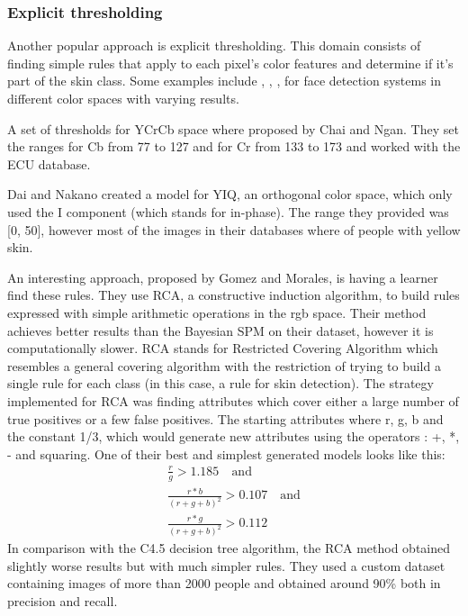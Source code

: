 \documentclass[12pt]{report}
\begin{document}
	\subsubsection{Explicit thresholding}
	Another popular approach is explicit thresholding. This domain consists of finding simple rules that apply to each pixel's color features and determine if it's part of the skin class. Some examples include \cite{rgb_threshold}, \cite{cr_cb_threshold}, \cite{yiq_threshold}, \cite{i_threshold} for face detection systems in different color spaces with varying results. 
 	
 	A set of thresholds for YCrCb space where proposed by Chai and Ngan\cite{cr_cb_threshold}. They set the ranges for Cb from 77 to 127 and for Cr from 133 to 173 and worked with the ECU database.
 	
 	Dai and Nakano\cite{yiq_threshold} created a model for YIQ, an orthogonal color space, which only used the I component (which stands for in-phase). The range they provided was [0, 50], however most of the images in their databases where of people with yellow skin.
 	
 	An interesting approach, proposed by Gomez and Morales\cite{rca_threshold}, is having a learner find these rules. They use RCA, a constructive induction algorithm, to build rules expressed with simple arithmetic operations in the rgb space. Their method achieves better results than the Bayesian SPM on their dataset, however it is computationally slower. RCA stands for Restricted Covering Algorithm which resembles a general covering algorithm with the restriction of trying to build a single rule for each class (in this case, a rule for skin detection). The strategy implemented for RCA was finding attributes which cover either a large number of true positives or a few false positives. The starting attributes where r, g, b and the constant 1/3, which would generate new attributes using the operators : +, *, - and squaring. One of their best and simplest generated models looks like this:
 	\begin{equation}
 	\begin{split}
 	\frac{r}{g} > 1.185 \quad \textrm{and}\\
 	\frac{r * b}{(r + g + b)^2} > 0.107 \quad \textrm{and}\\
 	\frac{r * g}{(r + g + b)^2} > 0.112
 	\end{split}
 	\end{equation}
 	In comparison with the C4.5 decision tree algorithm, the RCA method obtained slightly worse results but with much simpler rules. They used a custom dataset containing images of more than 2000 people and obtained around 90\% both in precision and recall.
 	
\end{document}
